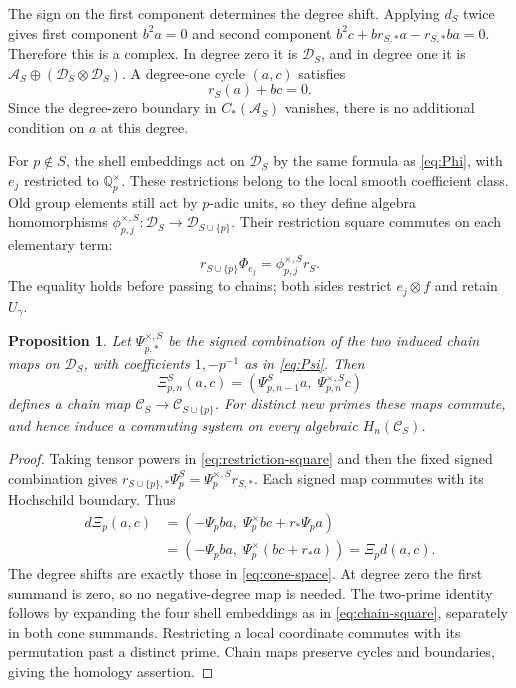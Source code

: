 \documentclass[11pt,letterpaper]{article}
\newtheorem{proposition}[theorem]{Proposition}
\theoremstyle{definition}
\theoremstyle{remark}
\newcommand{\Q}{\mathbb Q}
\newcommand{\Acal}{\mathcal A}
\begin{document}
The sign on the first component determines the degree shift.
Applying $d_S$ twice gives first component $b^2a=0$ and second
component $b^2c+br_{S,*}a-r_{S,*}ba=0$. Therefore this is a
complex. In degree zero it is $\mathscr D_S$, and in degree one it
is $\Acal_S\oplus(\mathscr D_S\otimes\mathscr D_S)$.
A degree-one cycle $(a,c)$ satisfies
\begin{equation}
 r_S(a)+bc=0.
 \label{eq:relative-cycle}
\end{equation}
Since the degree-zero boundary in $C_*(\Acal_S)$ vanishes, there
is no additional condition on $a$ at this degree.

For $p\notin S$, the shell embeddings act on $\mathscr D_S$ by
the same formula as \eqref{eq:Phi}, with $e_j$ restricted to
$\Q_p^\times$. These restrictions belong to the local smooth
coefficient class. Old group elements still act by $p$-adic units,
so they define algebra homomorphisms
$\phi_{p,j}^{\times,S}:\mathscr D_S\to\mathscr D_{S\cup\{p\}}$.
Their restriction square commutes on each elementary term:
\begin{equation}
 r_{S\cup\{p\}}\Phi_{e_j}
     =\phi_{p,j}^{\times,S}r_S.
 \label{eq:restriction-square}
\end{equation}
The equality holds before passing to chains; both sides restrict
$e_j\otimes f$ and retain $U_\gamma$.

\begin{proposition}\label{prop:cone-maps}
Let $\Psi_{p,*}^{\times,S}$ be the signed combination of the two
induced chain maps on $\mathscr D_S$, with coefficients $1,-p^{-1}$
as in \eqref{eq:Psi}. Then
\begin{equation}
 \Xi_{p,n}^S(a,c)=
       (\Psi_{p,n-1}^Sa,\;\Psi_{p,n}^{\times,S}c)
 \label{eq:cone-map}
\end{equation}
defines a chain map $\mathscr C_S\to\mathscr C_{S\cup\{p\}}$.
For distinct new primes these maps commute, and hence induce a
commuting system on every algebraic $H_n(\mathscr C_S)$.
\end{proposition}
\begin{proof}
Taking tensor powers in \eqref{eq:restriction-square} and then
the fixed signed combination gives
$r_{S\cup\{p\},*}\Psi_p^S=\Psi_p^{\times,S}r_{S,*}$.
Each signed map commutes with its Hochschild boundary. Thus
\begin{align*}
 d\Xi_p(a,c)
 &=(-\Psi_pba,\;\Psi_p^\times bc+r_*\Psi_pa)\\
 &=(-\Psi_pba,\;\Psi_p^\times(bc+r_*a))
 =\Xi_pd(a,c).
\end{align*}
The degree shifts are exactly those in \eqref{eq:cone-space}.
At degree zero the first summand is zero, so no negative-degree
map is needed. The two-prime identity follows by expanding the
four shell embeddings as in \eqref{eq:chain-square}, separately
in both cone summands. Restricting a local coordinate commutes
with its permutation past a distinct prime. Chain maps preserve
cycles and boundaries, giving the homology assertion.
\end{proof}
\end{document}
